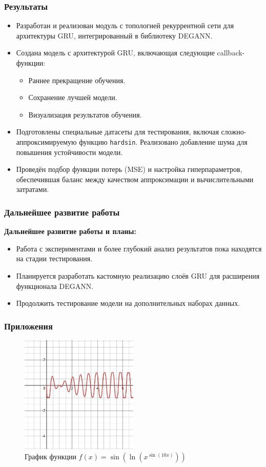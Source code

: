\documentclass
  [ russian
  , aspectratio=1610 %
  ] {beamer}
\begin{document}
\begin{frame}
    \frametitle{Результаты}
    \begin{itemize}
        \item Разработан и реализован модуль с топологией рекуррентной сети для архитектуры GRU, интегрированный в библиотеку DEGANN.
        \item Создана модель с архитектурой GRU, включающая следующие callback-функции:
        \begin{itemize}
            \item Раннее прекращение обучения.
            \item Сохранение лучшей модели.
            \item Визуализация результатов обучения.
        \end{itemize}
        \item Подготовлены специальные датасеты для тестирования, включая сложно-аппроксимируемую функцию \texttt{hardsin}. Реализовано добавление шума для повышения устойчивости модели.
        \item Проведён подбор функции потерь (MSE) и настройка гиперпараметров, обеспечившая баланс между качеством аппроксимации и вычислительными затратами.
    \end{itemize}
\end{frame}


\begin{frame}
    \frametitle{Дальнейшее развитие работы}
    \textbf{Дальнейшее развитие работы и планы:}
        \begin{itemize}
            \item Работа с экспериментами и более глубокий анализ результатов пока находятся на стадии тестирования.
            \item Планируется разработать кастомную реализацию слоёв GRU для расширения функционала DEGANN.
            \item Продолжить тестирование модели на дополнительных наборах данных.
        \end{itemize}
\end{frame}

\begin{frame}
    \frametitle{Приложения}
    \begin{figure}[H]
        \centering
        \includegraphics[width=0.5\textwidth]{figures/graph_hardsin.png}
        \caption{График функции $f(x) = \sin\left(\ln(x^{\sin(10x)})\right)$}
        \label{fig:hardsin_graph}
    \end{figure}
\end{frame}
\end{document}

